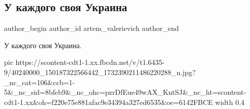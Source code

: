  
 
 
 
 
 
\subsection{У каждого своя Украина}
\label{sec:26_08_2018.fb.artem_valerievich.1.gaslo_slava_ukraine}
 
\ifcmt
 author_begin
   author_id artem_valerievich
 author_end
\fi

У каждого своя Украина.

\ifcmt
  pic https://scontent-cdt1-1.xx.fbcdn.net/v/t1.6435-9/40240000_150187322566442_1732390211486220288_n.jpg?_nc_cat=106&ccb=1-5&_nc_sid=8bfeb9&_nc_ohc=pzrDfEue49wAX_KntSJ&_nc_ht=scontent-cdt1-1.xx&oh=f220e75e881afac9e34394a327ed6535&oe=6142FBCE
  width 0.4
\fi


